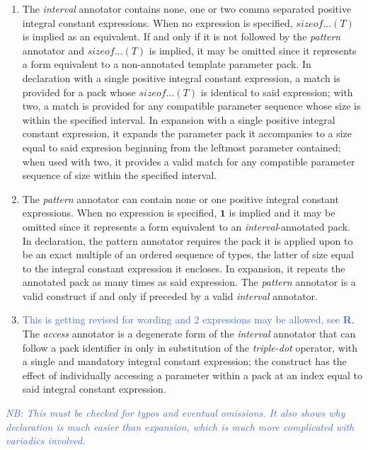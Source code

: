 \begin{enumerate}
\item\p The \textit{interval} annotator contains none, one or two comma separated positive integral constant expressions.
When no expression is specified, $sizeof...(T)$ is implied as an equivalent.
If and only if it is not followed by the \textit{pattern} annotator and $sizeof...(T)$ is implied, it may be omitted since it represents a form equivalent to a non-annotated template parameter pack.
In declaration with a single positive integral constant expression, a match is provided for a pack whose $sizeof...(T)$ is identical to said expression; with two, a match is provided for any compatible parameter sequence whose size is within the specified interval.
In expansion with a single positive integral constant expression, it expands the parameter pack it accompanies to a size equal to said expresion beginning from the leftmost parameter contained;
when used with two, it provides a valid match for any compatible parameter sequence of size within the specified interval.

\item\p The \textit{pattern} annotator can contain none or one positive integral constant expressions.
When no expression is specified, $\bm{1}$ is implied and it may be omitted since it represents a form equivalent to an \textit{interval}-annotated pack.
In declaration, the pattern annotator requires the pack it is applied upon to be an exact multiple of an ordered sequence of types, the latter of size equal to the integral constant expression it encloses. In expansion, it repeats the annotated pack as many times as said expression.
The \textit{pattern} annotator is a valid construct if and only if preceded by a valid \textit{interval} annotator.

\item\p \textcolor{RoyalBlue}{This is getting revised for wording and 2 expressions may be allowed, see \textbf{R}}.
The \textit{access} annotator is a degenerate form of the \textit{interval} annotator that can follow a pack identifier in only in substitution of the \textit{triple-dot} operator, with a single and mandatory integral constant expression; the construct has the effect of individually accessing a parameter within a pack at an index equal to said integral constant expression.
\end{enumerate}

\textcolor{RoyalBlue}{\textit{NB: This must be checked for typos and eventual omissions.
It also shows why declaration is much easier than expansion, which is much more complicated with variadics involved.}}

